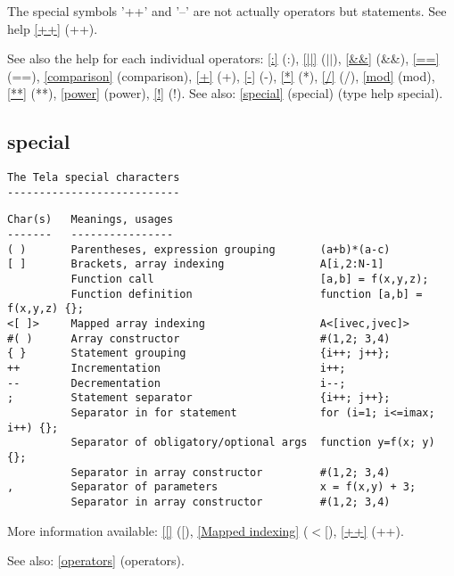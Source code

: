 \documentclass[a4paper]{article}
\begin{document}
The special symbols '++' and '--' are not actually operators but
statements. See help \ref{++} {(++)}.

See also the help for each individual operators:
\ref{:} {(:)}, \ref{||} {({$|$}{$|$})}, \ref{&&} {(\&\&)}, \ref{==} {(==)},
\ref{comparison} {(comparison)}, \ref{+} {(+)}, \ref{-} {(-)},
\ref{*} {(*)}, \ref{/} {(/)}, \ref{mod} {(mod)}, \ref{**} {(**)},
\ref{power} {(power)}, \ref{!} {(!)}.
See also: \ref{special} {(special)} (type help special).




\subsection{special\label{special}}

\begin{tscreen}
\begin{verbatim}
The Tela special characters
---------------------------
\end{verbatim}
\end{tscreen}


\begin{tscreen}
\begin{verbatim}
Char(s)   Meanings, usages
-------   ----------------
( )       Parentheses, expression grouping       (a+b)*(a-c)
[ ]       Brackets, array indexing               A[i,2:N-1]
          Function call                          [a,b] = f(x,y,z);
          Function definition                    function [a,b] = f(x,y,z) {};
<[ ]>     Mapped array indexing                  A<[ivec,jvec]>
#( )      Array constructor                      #(1,2; 3,4)
{ }       Statement grouping                     {i++; j++};
++        Incrementation                         i++;
--        Decrementation                         i--;
;         Statement separator                    {i++; j++};
          Separator in for statement             for (i=1; i<=imax; i++) {};
          Separator of obligatory/optional args  function y=f(x; y) {};
          Separator in array constructor         #(1,2; 3,4)
,         Separator of parameters                x = f(x,y) + 3;
          Separator in array constructor         #(1,2; 3,4)
\end{verbatim}
\end{tscreen}


More information available:
\ref{[} {([)}, \ref{Mapped indexing} {({$<$}[)},
\ref{++} {(++)}.

See also: \ref{operators} {(operators)}.
\end{document}
